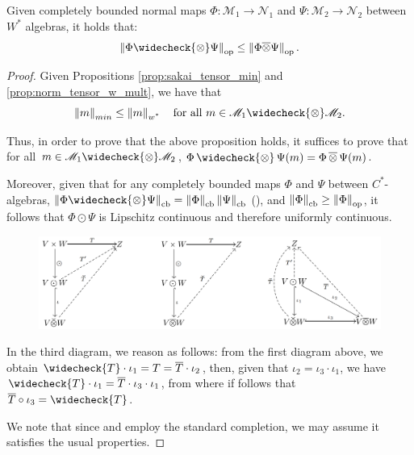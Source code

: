 
\begin{proposition} \label{prop:opnorm_min_leq_wopnorm}
 Given completely bounded normal maps $\Phi:\mathscr{M}_1 \to \mathscr{N}_1 $ and $\Psi:\mathscr{M}_2 \to \mathscr{N}_2$ between $W^*$ algebras, it holds that:
 \[\opnorm{\Phi \widecheck{\otimes} \Psi} \leq \opnorm{\Phi \overline{\otimes} \Psi}. \]
\end{proposition}

\begin{proof}
  Given Propositions \ref{prop:sakai_tensor_min} and \ref{prop:norm_tensor_w_mult}, we have that 
  \[\minnorm{m} \leq \wnorm{m}  \quad \text{for all } m \in \mathscr{M}_1\widecheck{\otimes} \mathscr{M}_2.\]

   Thus, in order to prove that the above proposition holds, it suffices to prove that for all $ m \in \mathscr{M}_1\widecheck{\otimes} \mathscr{M}_2$, $\Phi \, \widecheck{\otimes} \, \Psi (m) = \Phi \, \overline{\otimes} \, \Psi (m)$.

   Moreover, given that for any completely bounded maps \(\Phi\) and \(\Psi\) between \(C^*\)-algebras,  $\cbnorm{\Phi \widecheck{\otimes} \Psi} = \cbnorm{\Phi} \cbnorm{\Psi}$ (\cite[Theorem 12.3]{paulsenCompletelyBoundedMaps2003}), and \(\left\lVert \Phi \right\rVert_{\text{cb}} \geq \left\lVert \Phi \right\rVert_{\text{op}}\), it follows that \(\Phi \odot \Psi\) is Lipschitz continuous and therefore uniformly continuous.


\begin{figure} [H] 
    \centering
    \begin{center}
        \includegraphics[width=1.0\textwidth]{images/Diagrama.png}
    \end{center}
\end{figure}

In the third diagram, we reason as follows:
from the first diagram above, we obtain $ \widecheck{T} \cdot \iota_1 = T =  \overline{T} \cdot \iota_2$, then, given that $\iota_2 = \iota_3 \cdot \iota_1$, we have  $ \widecheck{T} \cdot \iota_1 =  \overline{T} \cdot \iota_3 \cdot \iota_1$, from where if follows that $\overline{T} \circ \iota_3 = \widecheck{T}$.


We note that since \cite{sakaiCAlgebrasWAlgebras1998} and \cite{takesakiTheoryOperatorAlgebras1979} employ the standard completion, we may assume it satisfies the usual properties. 

\end{proof}

